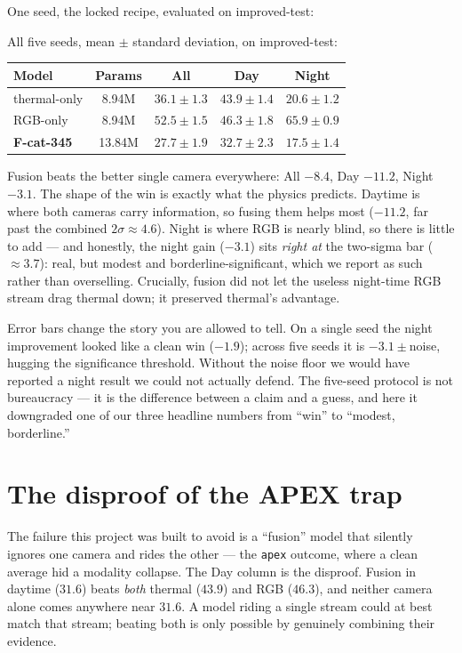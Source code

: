 \documentclass[../main.tex]{subfiles}
\begin{document}
One seed, the locked recipe, evaluated on improved-test:

All five seeds, mean $\pm$ standard deviation, on improved-test:

\begin{center}
\begin{tabular}{lcccc}
\toprule
Model & Params & All & Day & Night \\
\midrule
thermal-only & 8.94M & $36.1\pm1.3$ & $43.9\pm1.4$ & $20.6\pm1.2$ \\
RGB-only     & 8.94M & $52.5\pm1.5$ & $46.3\pm1.8$ & $65.9\pm0.9$ \\
\textbf{F-cat-345} & 13.84M & $\mathbf{27.7\pm1.9}$ & $\mathbf{32.7\pm2.3}$ & $\mathbf{17.5\pm1.4}$ \\
\bottomrule
\end{tabular}
\end{center}

Fusion beats the better single camera everywhere: All $-8.4$, Day $\mathbf{-11.2}$, Night $-3.1$.
The shape of the win is exactly what the physics predicts. Daytime is where both cameras carry
information, so fusing them helps most ($-11.2$, far past the combined $2\sigma\approx4.6$). Night is
where RGB is nearly blind, so there is little to add --- and honestly, the night gain ($-3.1$) sits
\emph{right at} the two-sigma bar ($\approx3.7$): real, but modest and borderline-significant, which
we report as such rather than overselling. Crucially, fusion did not let the useless night-time RGB
stream drag thermal down; it preserved thermal's advantage.

\begin{lesson}
Error bars change the story you are allowed to tell. On a single seed the night improvement looked
like a clean win ($-1.9$); across five seeds it is $-3.1\pm$noise, hugging the significance
threshold. Without the noise floor we would have reported a night result we could not actually
defend. The five-seed protocol is not bureaucracy --- it is the difference between a claim and a
guess, and here it downgraded one of our three headline numbers from ``win'' to ``modest, borderline.''
\end{lesson}

\section{The disproof of the APEX trap}

The failure this project was built to avoid is a ``fusion'' model that silently ignores one camera
and rides the other --- the \texttt{apex} outcome, where a clean average hid a modality collapse.
The Day column is the disproof. Fusion in daytime ($31.6$) beats \emph{both} thermal ($43.9$) and RGB
($46.3$), and neither camera alone comes anywhere near $31.6$. A model riding a single stream could
at best match that stream; beating both is only possible by genuinely combining their evidence.
\end{document}

